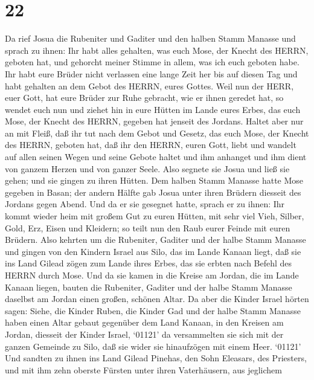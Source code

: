 \hypertarget{section-21}{%
\section{22}\label{section-21}}

 Da rief Josua die Rubeniter und Gaditer und den halben
Stamm Manasse  und sprach zu ihnen: Ihr habt alles gehalten,
was euch Mose, der Knecht des HERRN, geboten hat, und gehorcht meiner
Stimme in allem, was ich euch geboten habe.  Ihr habt eure
Brüder nicht verlassen eine lange Zeit her bis auf diesen Tag und habt
gehalten an dem Gebot des HERRN, eures Gottes.  Weil nun der
HERR, euer Gott, hat eure Brüder zur Ruhe gebracht, wie er ihnen geredet
hat, so wendet euch nun und ziehet hin in eure Hütten im Lande eures
Erbes, das euch Mose, der Knecht des HERRN, gegeben hat jenseit des
Jordans.  Haltet aber nur an mit Fleiß, daß ihr tut nach dem
Gebot und Gesetz, das euch Mose, der Knecht des HERRN, geboten hat, daß
ihr den HERRN, euren Gott, liebt und wandelt auf allen seinen Wegen und
seine Gebote haltet und ihm anhanget und ihm dient von ganzem Herzen und
von ganzer Seele.  Also segnete sie Josua und ließ sie
gehen; und sie gingen zu ihren Hütten.  Dem halben Stamm
Manasse hatte Mose gegeben in Basan; der andern Hälfte gab Josua unter
ihren Brüdern diesseit des Jordans gegen Abend. Und da er sie gesegnet
hatte,  sprach er zu ihnen: Ihr kommt wieder heim mit großem
Gut zu euren Hütten, mit sehr viel Vieh, Silber, Gold, Erz, Eisen und
Kleidern; so teilt nun den Raub eurer Feinde mit euren Brüdern.
 Also kehrten um die Rubeniter, Gaditer und der halbe Stamm
Manasse und gingen von den Kindern Israel aus Silo, das im Lande Kanaan
liegt, daß sie ins Land Gilead zögen zum Lande ihres Erbes, das sie
erbten nach Befehl des HERRN durch Mose.  Und da sie kamen
in die Kreise am Jordan, die im Lande Kanaan liegen, bauten die
Rubeniter, Gaditer und der halbe Stamm Manasse daselbst am Jordan einen
großen, schönen Altar.  Da aber die Kinder Israel hörten
sagen: Siehe, die Kinder Ruben, die Kinder Gad und der halbe Stamm
Manasse haben einen Altar gebaut gegenüber dem Land Kanaan, in den
Kreisen am Jordan, diesseit der Kinder Israel,  `01121' da
versammelten sie sich mit der ganzen Gemeinde zu Silo, daß sie wider sie
hinaufzögen mit einem Heer.  `01121' Und sandten zu ihnen
ins Land Gilead Pinehas, den Sohn Eleasars, des Priesters, 
und mit ihm zehn oberste Fürsten unter ihren Vaterhäusern, aus jeglichem
